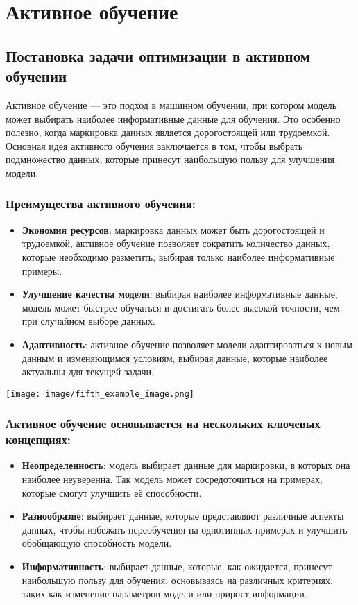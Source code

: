\documentclass{article}
\begin{document}
\section*{Активное обучение}

\subsection*{Постановка задачи оптимизации в активном обучении}

Активное обучение — это подход в машинном обучении, при котором модель может выбирать наиболее информативные данные для обучения. Это особенно полезно, когда маркировка данных является дорогостоящей или трудоемкой. Основная идея активного обучения заключается в том, чтобы выбрать подмножество данных, которые принесут наибольшую пользу для улучшения модели.

\subsubsection*{Преимущества активного обучения:}
\begin{itemize}
    \item \textbf{Экономия ресурсов}: маркировка данных может быть дорогостоящей и трудоемкой, активное обучение позволяет сократить количество данных, которые необходимо разметить, выбирая только наиболее информативные примеры.
    \item \textbf{Улучшение качества модели}: выбирая наиболее информативные данные, модель может быстрее обучаться и достигать более высокой точности, чем при случайном выборе данных.
    \item \textbf{Адаптивность}: активное обучение позволяет модели адаптироваться к новым данным и изменяющимся условиям, выбирая данные, которые наиболее актуальны для текущей задачи.
\end{itemize}

\begin{center}
    \texttt{[image: image/fifth\_example\_image.png]}
    \label{fig:enter-label}
\end{center}

\subsubsection*{Активное обучение основывается на нескольких ключевых концепциях:}
\begin{itemize}
    \item \textbf{Неопределенность}: модель выбирает данные для маркировки, в которых она наиболее неуверенна. Так модель может сосредоточиться на примерах, которые смогут улучшить её способности.
    \item \textbf{Разнообразие}: выбирает данные, которые представляют различные аспекты данных, чтобы избежать переобучения на однотипных примерах и улучшить обобщающую способность модели.
    \item \textbf{Информативность}: выбирает данные, которые, как ожидается, принесут наибольшую пользу для обучения, основываясь на различных критериях, таких как изменение параметров модели или прирост информации.
\end{itemize}
\end{document}
